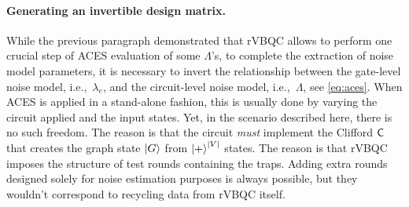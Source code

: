 

\paragraph{Generating an invertible design matrix.}
While the previous paragraph demonstrated that rVBQC allows to perform one crucial step of ACES evaluation of some \(\Lambda\)'s, to complete the extraction of noise model parameters, it is necessary to invert the relationship between the gate-level noise model, i.e.,~\(\lambda_{e}\), and the circuit-level noise model, i.e.,~\(\Lambda\), see \cref{eq:aces}. When ACES is applied in a stand-alone fashion, this is usually done by varying the circuit applied and the input states. Yet, in the scenario described here, there is no such freedom. The reason is that the circuit \emph{must} implement the Clifford \(\mathsf{C}\) that creates the graph state \(\ket G\) from \(\ket{+}^{|V|}\) states. The reason is that rVBQC imposes the structure of test rounds containing the traps. Adding extra rounds designed solely for noise estimation purposes is always possible, but they wouldn't correspond to recycling data from rVBQC itself.

